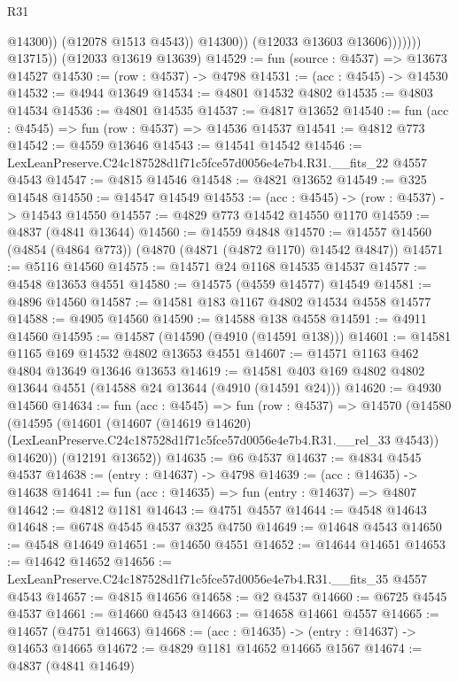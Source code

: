 \begin{lexlean}{R31}
\begin{coremodule}
                              @14300))
                          (@12078 @1513 @4543))
                        @14300))
                    (@12033 @13603 @13606)))))))
        @13715))
    (@12033 @13619 @13639)
@14529 := fun (source : @4537) => @13673 @14527
@14530 := (row : @4537) -> @4798
@14531 := (acc : @4545) -> @14530
@14532 := @4944 @13649
@14534 := @4801 @14532 @4802
@14535 := @4803 @14534
@14536 := @4801 @14535
@14537 := @4817 @13652
@14540 := fun (acc : @4545) => fun (row : @4537) => @14536 @14537
@14541 := @4812 @773
@14542 := @4559 @13646
@14543 := @14541 @14542
@14546 := LexLeanPreserve.C24c187528d1f71c5fce57d0056e4e7b4.R31.__fits_22 @4557 @4543
@14547 := @4815 @14546
@14548 := @4821 @13652
@14549 := @325 @14548
@14550 := @14547 @14549
@14553 := (acc : @4545) -> (row : @4537) -> @14543 @14550
@14557 := @4829 @773 @14542 @14550 @1170
@14559 := @4837 (@4841 @13644)
@14560 := @14559 @4848
@14570 := @14557 @14560 (@4854 (@4864 @773)) (@4870 (@4871 (@4872 @1170) @14542 @4847))
@14571 := @5116 @14560
@14575 := @14571 @24 @1168 @14535 @14537
@14577 := @4548 @13653 @4551
@14580 := @14575 (@4559 @14577) @14549
@14581 := @4896 @14560
@14587 := @14581 @183 @1167 @4802 @14534 @4558 @14577
@14588 := @4905 @14560
@14590 := @14588 @138 @4558
@14591 := @4911 @14560
@14595 := @14587 (@14590 (@4910 (@14591 @138)))
@14601 := @14581 @1165 @169 @14532 @4802 @13653 @4551
@14607 := @14571 @1163 @462 @4804 @13649 @13646 @13653
@14619 := @14581 @403 @169 @4802 @4802 @13644 @4551 (@14588 @24 @13644 (@4910 (@14591 @24)))
@14620 := @4930 @14560
@14634 := fun (acc : @4545) =>
  fun (row : @4537) =>
  @14570
    (@14580
      (@14595
        (@14601
          (@14607
            (@14619 @14620)
            (LexLeanPreserve.C24c187528d1f71c5fce57d0056e4e7b4.R31.__rel_33 @4543))
          @14620))
      (@12191 @13652))
@14635 := @6 @4537
@14637 := @4834 @4545 @4537
@14638 := (entry : @14637) -> @4798
@14639 := (acc : @14635) -> @14638
@14641 := fun (acc : @14635) => fun (entry : @14637) => @4807
@14642 := @4812 @1181
@14643 := @4751 @4557
@14644 := @4548 @14643
@14648 := @6748 @4545 @4537 @325 @4750
@14649 := @14648 @4543
@14650 := @4548 @14649
@14651 := @14650 @4551
@14652 := @14644 @14651
@14653 := @14642 @14652
@14656 := LexLeanPreserve.C24c187528d1f71c5fce57d0056e4e7b4.R31.__fits_35 @4557 @4543
@14657 := @4815 @14656
@14658 := @2 @4537
@14660 := @6725 @4545 @4537
@14661 := @14660 @4543
@14663 := @14658 @14661 @4557
@14665 := @14657 (@4751 @14663)
@14668 := (acc : @14635) -> (entry : @14637) -> @14653 @14665
@14672 := @4829 @1181 @14652 @14665 @1567
@14674 := @4837 (@4841 @14649)

\end{coremodule}
\end{lexlean}
